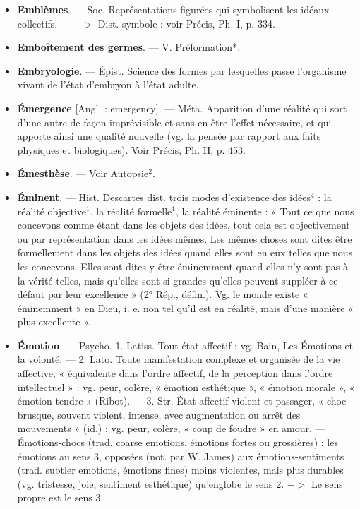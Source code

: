 \begin{itemize}[leftmargin=1cm, label=, itemsep=1pt]
\item {\bf Emblèmes}. — Soc. Représentations
figurées qui symbolisent les idéaux
collectifs. — $->$ Dist. symbole :
voir Précis, Ph. I, p. 334.

\item {\bf Emboîtement des germes}. — V. Préformation*.

\item {\bf Embryologie}. — Épist. Science des
formes par lesquelles passe l’organisme vivant de l’état d’embryon à
l’état adulte.

\item {\bf Émergence} [Angl. : emergency]. —
Méta. Apparition d’une réalité qui
sort d’une autre de façon imprévisible et sans en être l'effet nécessaire, et qui apporte ainsi une qualité nouvelle (vg. la pensée par rapport aux faits physiques et biologiques). Voir Précis, Ph. II, p. 453.

\item {\bf Émesthèse}. — Voir Autopsie$^2$.

\item {\bf Éminent}. — Hist. Descartes dist. trois
modes d’existence des idées$^4$ : la
réalité objective$^1$, la réalité formelle$^1$,
la réalité éminente : « Tout ce que
nous concevons comme étant dans
les objets des idées, tout cela est
objectivement ou par représentation
dans les idées mêmes. Les mêmes
choses sont dites être formellement
dans les objets des idées quand elles
sont en eux telles que nous les concevons. Elles sont dites y être éminemment quand elles n’y sont pas
à la vérité telles, mais qu’elles sont
si grandes qu’elles peuvent suppléer
à ce défaut par leur excellence »
(2° Rép., défin.). Vg. le monde existe
« éminemment » en Dieu, i. e. non
tel qu’il est en réalité, mais d’une
manière « plus excellente ».

\item {\bf Émotion}. — Psycho. 1. Latiss. Tout
état affectif : vg. Bain, Les Émotions
et la volonté. — 2. Lato. Toute manifestation complexe et organisée
de la vie affective, « équivalente
dans l’ordre affectif, de la perception dans l'ordre intellectuel » :
vg. peur, colère, « émotion esthétique », « émotion morale », « émotion tendre » (Ribot). — 3. Str.
État affectif violent et passager,
« choc brusque, souvent violent,
intense, avec augmentation ou arrêt
des mouvements » (id.) : vg. peur,
colère, « coup de foudre » en amour.
— Émotions-chocs (trad. coarse emotions, émotions fortes ou grossières) :
les émotions au sens 3, opposées
(not. par W. James) aux émotions-sentiments (trad. subtler emotions,
émotions fines) moins violentes,
mais plus durables (vg. tristesse,
joie, sentiment esthétique) qu'englobe le sens 2. $->$ Le sens propre
est le sens 3.


\end{itemize}
